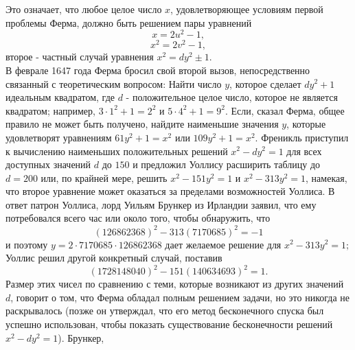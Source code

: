 \documentclass[11pt]{article}
\begin{document}
Это означает, что любое целое число $x$, удовлетворяющее условиям первой проблемы Ферма, должно быть решением пары уравнений \[x=2u^{2}-1,\] \[ x^{2}=2v^{2}-1,\] 
второе - частный случай уравнения $x^{2}=dy^{2}\pm1.$ \\
В феврале 1647 года Ферма бросил свой второй вызов, непосредственно связанный с теоретическим вопросом: Найти число $y$, которое сделает $dy^{2}+1$ идеальным квадратом, где $d$ - положительное целое число, которое не является квадратом; например, $3\cdot1^{2}+1=2^{2}$ и $5\cdot4^{2}+1=9^{2}.$ Если, сказал Ферма, общее правило не может быть получено, найдите наименьшие значения $y$, которые удовлетворят уравнениям $61y^{2}+1=x^{2}$ или $109y^{2}+1=x^{2}.$ Френикль приступил к вычислению наименьших положительных решений $x^{2}-dy^{2}=1$ для всех доступных значений $d$ до $150$ и предложил Уоллису расширить таблицу до $d=200$ или, по крайней мере, решить $x^{2}-151y^{2}=1$ и $x^{2}-313y^{2}=1$, намекая, что второе уравнение может оказаться за пределами возможностей Уоллиса. В ответ патрон Уоллиса, лорд Уильям Брункер из Ирландии заявил, что ему потребовался всего час или около того, чтобы обнаружить, что \[(126862368)^{2}-313(7170685)^{2}=-1\] 
и поэтому $y=2\cdot7170685\cdot126862368$ дает желаемое решение для $x^{2}-313y^{2}=1;$ Уоллис решил другой конкретный случай, поставив \[(1728148040)^{2}-151(140634693)^{2}=1.\] Размер этих чисел по сравнению с теми, которые возникают из других значений $d$, говорит о том, что Ферма обладал полным решением задачи, но это никогда не раскрывалось (позже он утверждал, что его метод бесконечного спуска был успешно использован, чтобы показать существование бесконечности решений $x^{2}-dy^{2}=1$). Брункер,
\end{document}
